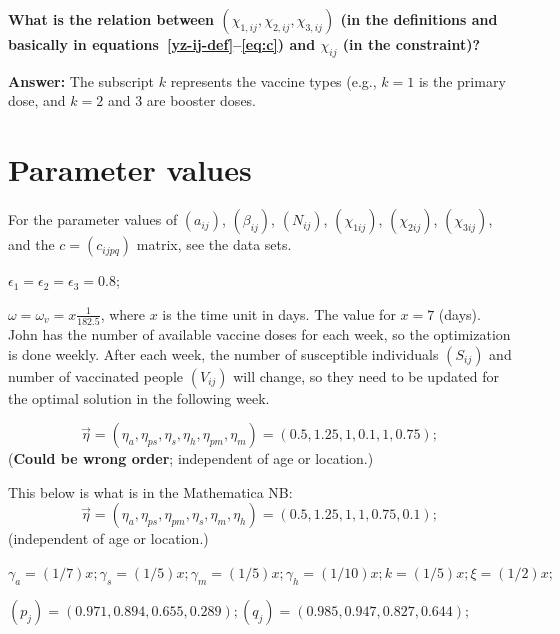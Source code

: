 \documentclass[12pt]{amsart}
\theoremstyle{definition}
\begin{document}
{\bf What is the relation between 
$(\chi_{1,ij},\chi_{2,ij},\chi_{3,ij})$ (in the definitions and basically in equations~\eqref{yz-ij-def}--\eqref{eq:c}) and $\chi_{ij}$ (in the constraint)? }

{\bf Answer:} The subscript $k$ represents the vaccine types (e.g., $k=1$ is the primary dose, and $k=2$ and 3 are booster doses.

\section{Parameter values}
For the parameter values of $(a_{ij})$,
$(\beta_{ij})$, $(N_{ij})$,
$(\chi_{1ij})$, $(\chi_{2ij})$, $(\chi_{3ij})$,
and the $c=(c_{ijpq})$ matrix, see the data sets.

$\epsilon_1=\epsilon_2=
\epsilon_3=0.8$;



$\omega=\omega_v=x \frac{1}{182.5}$, where $x$ is the time unit in days.
The value for $x=7$ (days). John has the number of available vaccine doses for each week, so the optimization is done weekly. After each week, the number of susceptible individuals $(S_{ij})$ and number of vaccinated people $(V_{ij})$  will change, so they need to be updated for the optimal solution in the following week.

$$
\vec{\eta} = (\eta_{a}, \eta_{ps}, \eta_{s}, \eta_{h}, \eta_{pm}, \eta_{m}) = 
(0.5, 1.25, 1, 0.1, 1, 0.75); 
$$ ({\color{magenta}\bf Could be wrong order};  independent of age or location.)

This below is what is in the Mathematica NB:
$$
\vec{\eta} = (\eta_{a}, \eta_{ps}, \eta_{pm}, \eta_{s}, \eta_{m}, \eta_{h}) = 
(0.5, 1.25, 1, 1, 0.75,0.1); 
$$ (independent of age or location.)


$
\gamma_a = (1/7) x; \gamma_s = (1/5) x; \gamma_m = (1/5) x; \gamma_h = 
 (1/10) x; 
k=(1/5) x; \xi=(1/2) x;
$

$(p_j)=(0.971, 0.894, 0.655, 0.289); 
(q_j)=(0.985, 0.947, 0.827, 0.644); 
$
\end{document}

